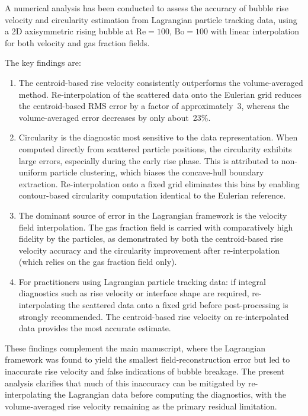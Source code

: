 \documentclass[11pt,a4paper]{article}
\begin{document}
A numerical analysis has been conducted to assess the accuracy of bubble
rise velocity and circularity estimation from Lagrangian particle tracking
data, using a 2D axisymmetric rising bubble at $\mathrm{Re}=100$,
$\mathrm{Bo}=100$ with linear interpolation for both velocity and gas
fraction fields.

The key findings are:

\begin{enumerate}[label=(\arabic*)]
  \item The centroid-based rise velocity consistently outperforms the
    volume-averaged method.  Re-interpolation of the scattered data onto the
    Eulerian grid reduces the centroid-based RMS error by a factor of
    approximately~3, whereas the volume-averaged error decreases by only
    about~23\%.

  \item Circularity is the diagnostic most sensitive to the data
    representation.  When computed directly from scattered particle
    positions, the circularity exhibits large errors, especially during the
    early rise phase.  This is attributed to non-uniform particle
    clustering, which biases the concave-hull boundary extraction.
    Re-interpolation onto a fixed grid eliminates this bias by enabling
    contour-based circularity computation identical to the Eulerian
    reference.

  \item The dominant source of error in the Lagrangian framework is the
    velocity field interpolation.  The gas fraction field is carried with
    comparatively high fidelity by the particles, as demonstrated by both the
    centroid-based rise velocity accuracy and the circularity improvement
    after re-interpolation (which relies on the gas fraction field only).

  \item For practitioners using Lagrangian particle tracking data: if
    integral diagnostics such as rise velocity or interface shape are
    required, re-interpolating the scattered data onto a fixed grid before
    post-processing is strongly recommended.  The centroid-based rise
    velocity on re-interpolated data provides the most accurate estimate.
\end{enumerate}

These findings complement the main manuscript, where the Lagrangian
framework was found to yield the smallest field-reconstruction error but
led to inaccurate rise velocity and false indications of bubble breakage.
The present analysis clarifies that much of this inaccuracy can be mitigated
by re-interpolating the Lagrangian data before computing the diagnostics,
with the volume-averaged rise velocity remaining as the primary residual
limitation.
\end{document}
